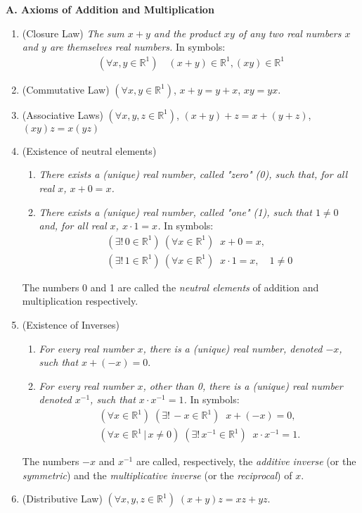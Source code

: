 \documentclass[12pt]{book}
\theoremstyle{definition}
\begin{document}
\textbf{A. Axioms of Addition and Multiplication}
\
\begin{enumerate}[label=\textbf{\Roman*}]
	\item (Closure Law) \textit{The sum $x+y$ and the product $xy$ of any two real numbers $x$ and $y$ are themselves real numbers.} In symbols: 
	\begin{align*}
	(\forall x,y \in \mathbb{R}^1) \quad (x+y ) \in 	\mathbb{R}^1, (xy) \in \mathbb{R}^1
	\end{align*}
	\item (Commutative Law) $(\forall x,y \in \mathbb{R}^1)$,  $x+y = y+x$, $xy = yx$.
	\item (Associative Laws) $(\forall x,y,z \in \mathbb{R}^1)$, $(x+y) +z = x + (y+z)$, $(xy)z =x(yz)$
	\item (Existence of neutral elements)
		\begin{enumerate}
			\item \textit{There exists a (unique) real number, called "zero" (0), such that, for all real $x$, $x+0 =x$.}
			\item \textit{There exists a (unique) real number, called "one" (1), such that $1 \neq 0$ and, for all real $x$, $x \cdot 1 =x$.} In symbols: 
			\begin{gather*}
				(\exists! \, 0 \in \mathbb{R}^1) \: (\forall x \in \mathbb{R}^1) \;\; x+0=x,\\
				(\exists! \, 1 \in \mathbb{R}^1) \: (\forall x \in \mathbb{R}^1) \;\; x \cdot 1 =x, \quad 1 \neq 0	
			\end{gather*}
  
		\end{enumerate}
		The numbers 0 and 1 are called the \textit{neutral elements} of addition and multiplication respectively.
	\item (Existence of Inverses)
		\begin{enumerate}
			\item \textit{For every real number $x$, there is a (unique) real number, denoted $-x$, such that $x + (-x) =0.$}
			\item \textit{For every real number $x$, other than 0, there is a (unique) real number denoted $x^{-1}$, such that $x \cdot x^{-1} =1$.} In symbols:
				\begin{gather*}
					(\forall x \in \mathbb{R}^1) \;(\exists! \, -x \in \mathbb{R}^1) \;\; x + (-x) =0,\\
					(\forall x \in \mathbb{R}^1 \,|\, x \neq 0) \; (\exists! \,  x^{-1} \in \mathbb{R}^1) \;\; x\cdot x^{-1} =1. 	
				\end{gather*}
 
		\end{enumerate}
		The numbers $-x$ and $x^{-1}$ are called, respectively, the \textit{additive inverse} (or the \textit{symmetric}) and the \textit{multiplicative inverse} (or the \textit{reciprocal}) of $x$.
	\item  (Distributive Law) $ (\forall x,y,z \in \mathbb{R}^1) \; (x+y)z = xz +yz.$ 
\end{enumerate}
\end{document}
